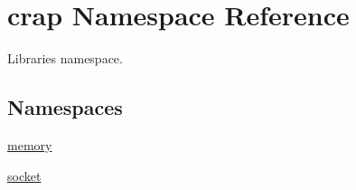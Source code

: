 \hypertarget{namespacecrap}{}\section{crap Namespace Reference}
\label{namespacecrap}


Libraries namespace.  


\subsection*{Namespaces}
\begin{DoxyCompactItemize}
\item 
 \hyperlink{namespacecrap_1_1memory}{memory}
\item 
 \hyperlink{namespacecrap_1_1socket}{socket}
\end{DoxyCompactItemize}
